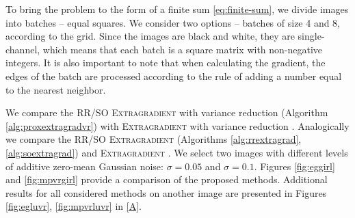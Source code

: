 \documentclass{article}
\begin{document}

To bring the problem to the form of a finite sum \eqref{eq:finite-sum}, we divide images into batches -- equal squares. We consider two options -- batches of size 4 and 8, according to the grid. Since the images are black and white, they are single-channel, which means that each batch is a square matrix with non-negative integers. It is also important to note that when calculating the gradient, the edges of the batch are processed according to the rule of adding a number equal to the nearest neighbor.

We compare the RR/SO \textsc{Extragradient} with variance reduction (Algorithm \ref{alg:proxextragradvr}) with \textsc{Extragradient} with variance reduction \citep{alacaoglu2022stochastic}. Analogically we compare the RR/SO \textsc{Extragradient} (Algorithms \ref{alg:rrextragrad}, \ref{alg:soextragrad}) and \textsc{Extragradient} \citep{juditsky2011solving}. We select two images with different levels of additive zero-mean Gaussian noise: \(\sigma = 0.05\) and \(\sigma = 0.1\). Figures \ref{fig:eggirl} and \ref{fig:mpvrgirl} provide a comparison of the proposed methods.
Additional results for all considered methods on another image are presented in Figures \ref{fig:egluvr}, \ref{fig:mpvrluvr} in \ref{A}. 
\end{document}
